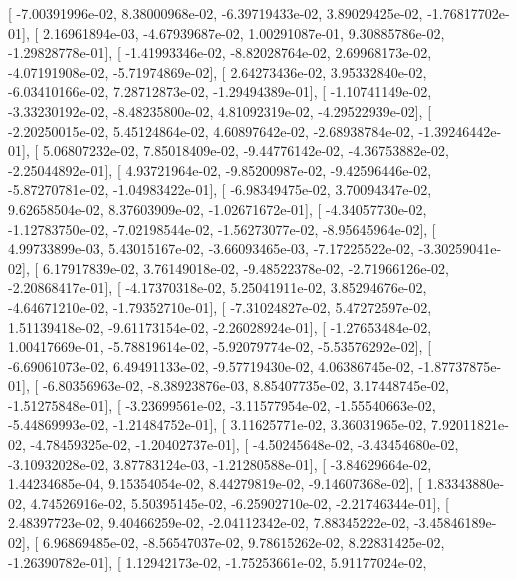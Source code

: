 \documentclass{article}
\begin{document}
       [ -7.00391996e-02,   8.38000968e-02,  -6.39719433e-02,
          3.89029425e-02,  -1.76817702e-01],
       [  2.16961894e-03,  -4.67939687e-02,   1.00291087e-01,
          9.30885786e-02,  -1.29828778e-01],
       [ -1.41993346e-02,  -8.82028764e-02,   2.69968173e-02,
         -4.07191908e-02,  -5.71974869e-02],
       [  2.64273436e-02,   3.95332840e-02,  -6.03410166e-02,
          7.28712873e-02,  -1.29494389e-01],
       [ -1.10741149e-02,  -3.33230192e-02,  -8.48235800e-02,
          4.81092319e-02,  -4.29522939e-02],
       [ -2.20250015e-02,   5.45124864e-02,   4.60897642e-02,
         -2.68938784e-02,  -1.39246442e-01],
       [  5.06807232e-02,   7.85018409e-02,  -9.44776142e-02,
         -4.36753882e-02,  -2.25044892e-01],
       [  4.93721964e-02,  -9.85200987e-02,  -9.42596446e-02,
         -5.87270781e-02,  -1.04983422e-01],
       [ -6.98349475e-02,   3.70094347e-02,   9.62658504e-02,
          8.37603909e-02,  -1.02671672e-01],
       [ -4.34057730e-02,  -1.12783750e-02,  -7.02198544e-02,
         -1.56273077e-02,  -8.95645964e-02],
       [  4.99733899e-03,   5.43015167e-02,  -3.66093465e-03,
         -7.17225522e-02,  -3.30259041e-02],
       [  6.17917839e-02,   3.76149018e-02,  -9.48522378e-02,
         -2.71966126e-02,  -2.20868417e-01],
       [ -4.17370318e-02,   5.25041911e-02,   3.85294676e-02,
         -4.64671210e-02,  -1.79352710e-01],
       [ -7.31024827e-02,   5.47272597e-02,   1.51139418e-02,
         -9.61173154e-02,  -2.26028924e-01],
       [ -1.27653484e-02,   1.00417669e-01,  -5.78819614e-02,
         -5.92079774e-02,  -5.53576292e-02],
       [ -6.69061073e-02,   6.49491133e-02,  -9.57719430e-02,
          4.06386745e-02,  -1.87737875e-01],
       [ -6.80356963e-02,  -8.38923876e-03,   8.85407735e-02,
          3.17448745e-02,  -1.51275848e-01],
       [ -3.23699561e-02,  -3.11577954e-02,  -1.55540663e-02,
         -5.44869993e-02,  -1.21484752e-01],
       [  3.11625771e-02,   3.36031965e-02,   7.92011821e-02,
         -4.78459325e-02,  -1.20402737e-01],
       [ -4.50245648e-02,  -3.43454680e-02,  -3.10932028e-02,
          3.87783124e-03,  -1.21280588e-01],
       [ -3.84629664e-02,   1.44234685e-04,   9.15354054e-02,
          8.44279819e-02,  -9.14607368e-02],
       [  1.83343880e-02,   4.74526916e-02,   5.50395145e-02,
         -6.25902710e-02,  -2.21746344e-01],
       [  2.48397723e-02,   9.40466259e-02,  -2.04112342e-02,
          7.88345222e-02,  -3.45846189e-02],
       [  6.96869485e-02,  -8.56547037e-02,   9.78615262e-02,
          8.22831425e-02,  -1.26390782e-01],
       [  1.12942173e-02,  -1.75253661e-02,   5.91177024e-02,
\end{document}
